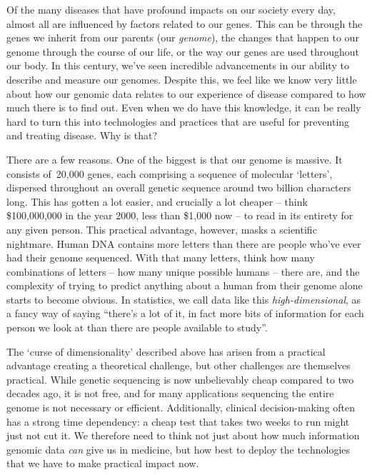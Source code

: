 \documentclass[../thesis.tex]{subfiles}
\begin{document}
Of the many diseases that have profound impacts on our society every day, almost all are influenced by factors related to our genes. This can be through the genes we inherit from our parents (our \emph{genome}), the changes that happen to our genome through the course of our life, or the way our genes are used throughout our body. In this century, we've seen incredible advancements in our ability to describe and measure our genomes. Despite this, we feel like we know very little about how our genomic data relates to our experience of disease compared to how much there is to find out. Even when we do have this knowledge, it can be really hard to turn this into technologies and practices that are useful for preventing and treating disease. Why is that?

There are a few reasons. One of the biggest is that our genome is massive. It consists of~20,000 genes, each comprising a sequence of molecular `letters', dispersed throughout an overall genetic sequence around two billion characters long. This has gotten a lot easier, and crucially a lot cheaper -- think \$100,000,000 in the year 2000, less than \$1,000 now -- to read in its entirety for any given person. This practical advantage, however, masks a scientific nightmare. Human DNA contains more letters than there are people who've ever had their genome sequenced. With that many letters, think how many combinations of letters -- how many unique possible humans -- there are, and the complexity of trying to predict anything about a human from their genome alone starts to become obvious. In statistics, we call data like this \emph{high-dimensional}, as a fancy way of saying ``there's a lot of it, in fact more bits of information for each person we look at than there are people available to study''. 

The `curse of dimensionality' described above has arisen from a practical advantage creating a theoretical challenge, but other challenges are themselves practical. While genetic sequencing is now unbelievably cheap compared to two decades ago, it is not free, and for many applications sequencing the entire genome is not necessary or efficient. Additionally, clinical decision-making often has a strong time dependency: a cheap test that takes two weeks to run might just not cut it. We therefore need to think not just about how much information genomic data \emph{can} give us in medicine, but how best to deploy the technologies that we have to make practical impact now.
\end{document}
